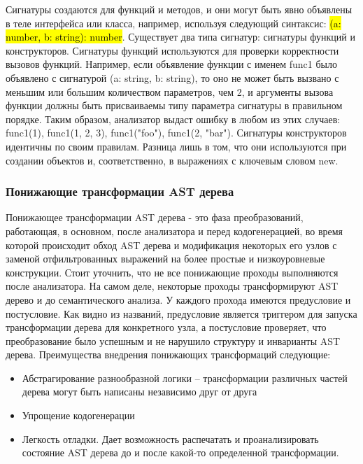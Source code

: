 Сигнатуры создаются для функций и методов, и они могут быть явно объявлены в теле интерфейса или класса,
например, используя следующий синтаксис: \hl{(a: number, b: string): number}.
Существует два типа сигнатур: сигнатуры функций и конструкторов.
Сигнатуры функций используются для проверки корректности вызовов функций.
Например, если объявление функции с именем func1 было объявлено с сигнатурой (a: string, b: string), то оно не может
быть вызвано с меньшим или большим количеством параметров, чем 2, и аргументы вызова функции должны быть присваиваемы
типу параметра сигнатуры в правильном порядке.
Таким образом, анализатор выдаст ошибку в любом из этих случаев:
func1(1), func1(1, 2, 3), func1("foo"), func1(2, "bar").
Сигнатуры конструкторов идентичны по своим правилам.
Разница лишь в том, что они используются при создании объектов и, соответственно, в выражениях с ключевым словом new.

\subsubsection{Понижающие трансформации AST дерева}

Понижающее трансформации AST дерева - это фаза преобразований, работающая, в основном, после анализатора и перед кодогенерацией,
во время которой происходит обход AST дерева и модификация некоторых его узлов с заменой отфильтрованных выражений на
более простые и низкоуровневые конструкции.
Стоит уточнить, что не все понижающие проходы выполняются после анализатора.
На самом деле, некоторые проходы трансформируют AST дерево и до семантического анализа.
У каждого прохода имеются предусловие и постусловие.
Как видно из названий, предусловие является триггером для запуска трансформации дерева для конкретного узла, а
постусловие проверяет, что преобразование было успешным и не нарушило структуру и инварианты AST дерева.
Преимущества внедрения понижающих трансформаций следующие:

\begin{itemize}[left=2em]
    \item Абстрагирование разнообразной логики – трансформации различных частей дерева могут быть написаны независимо
    друг от друга
    \item Упрощение кодогенерации
    \item Легкость отладки.
    Дает возможность распечатать и проанализировать состояние AST дерева до и после какой-то определенной трансформации.
\end{itemize}

